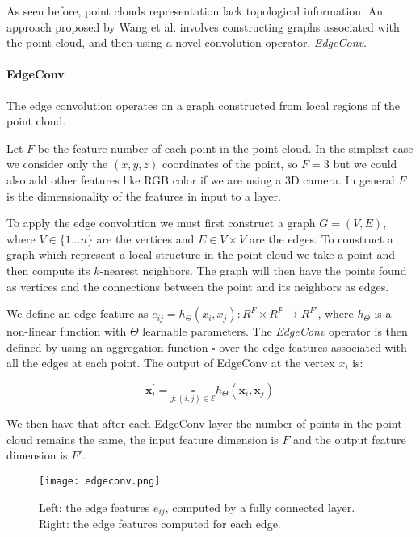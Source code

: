 As seen before, point clouds representation lack topological information.
An approach proposed by Wang et al. \cite{Wang2019} involves constructing graphs associated with the point cloud, and then using a novel convolution operator, \textit{EdgeConv}.

\paragraph{EdgeConv} The edge convolution operates on a graph constructed from local regions of the point cloud.

Let $F$ be the feature number of each point in the point cloud. In the simplest case we consider only the $(x,y,z)$ coordinates of the point, so $F = 3$ but we could also add other features like RGB color if we are using a 3D camera. In general $F$ is the dimensionality of the features in input to a layer.

To apply the edge convolution we must first construct a graph $G = (V,E)$, where $V \in \{1 \dots n\}$ are the vertices and $E \in V \times V$ are the edges. To construct a graph which represent a local structure in the point cloud we take a point and then compute its $k$-nearest neighbors. The graph will then have the points found as vertices and the connections between the point and its neighbors as edges.

We define an edge-feature as $e_{ij} = h_{\Theta}(x_i, x_j) : R^F \times R^F \rightarrow R^{F'}$, where $h_{\Theta}$ is a non-linear function with $\Theta$ learnable parameters. The \textit{EdgeConv} operator is then defined by using an aggregation function $\square$ over the edge features associated with all the edges at each point. The output of EdgeConv at the vertex $x_i$ is:

\begin{equation}
\mathbf{x}_{i}^{\prime}=\underset{j:(i, j) \in \mathcal{E}}{\square} h_{\Theta}\left(\mathbf{x}_{i}, \mathbf{x}_{j}\right)
\end{equation}

We then have that after each EdgeConv layer the number of points in the point cloud remains the same, the input feature dimension is $F$ and the output feature dimension is $F'$.

\begin{figure}[ht]
    \centering
    \texttt{[image: edgeconv.png]}
    \caption{Left: the edge features $e_{ij}$, computed by a fully connected layer. Right: the edge features computed for each edge.}
    \label{fig:edgeConvOperator}
\end{figure}

